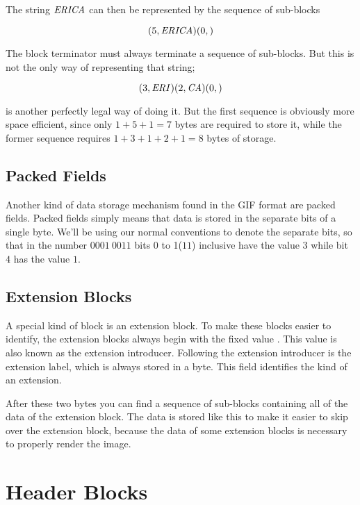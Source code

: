 The string $\mathit{ERICA}$ can then be represented by the sequence of
sub-blocks

\begin{equation*}
  (5,\mathit{ERICA})(0,)
\end{equation*}

The block terminator must always terminate a sequence of
sub-blocks. But this is not the only way of representing that string;

\begin{equation*}
  (3,\mathit{ERI})(2,\mathit{CA})(0,)
\end{equation*}

is another perfectly legal way of doing it. But the first sequence is
obviously more space efficient, since only $1 + 5 + 1 = 7$ bytes are
required to store it, while the former sequence requires $1 + 3 + 1 +
2 + 1 = 8$ bytes of storage.

\subsection{Packed Fields}

Another kind of data storage mechanism found in the GIF format are
packed fields. Packed fields simply means that data is stored in the
separate bits of a single byte. We'll be using our normal conventions
to denote the separate bits, so that in the number $0001\ 0011$ bits 0
to 1($11$) inclusive have the value $3$ while bit $4$ has the value
$1$.

\subsection{Extension Blocks}

A special kind of block is an extension block. To make these blocks
easier to identify, the extension blocks always begin with the fixed
value . This value is also known as the extension
introducer. Following the extension
introducer is the extension label, which is always stored in a
byte. This field identifies the kind of an extension.

After these two bytes you can find a sequence of sub-blocks containing
all of the data of the extension block. The data is stored like this
to make it easier to skip over the extension block, because the data
of some extension blocks is necessary to properly render the image.

\section{Header Blocks}


